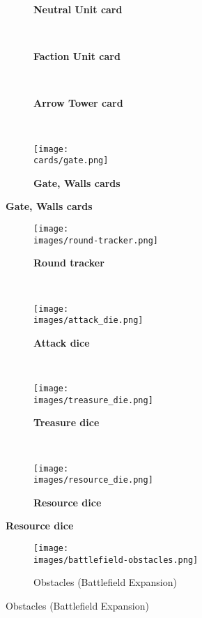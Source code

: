 \vspace*{-2em}
\begin{figure}[H]
  \centering
  \begin{subfigure}[t]{0.23\linewidth}
    \centering
    \caption{\textbf{Neutral Unit card}}
  \end{subfigure}
  ~
  \begin{subfigure}[t]{0.23\linewidth}
    \centering
    \caption{\textbf{Faction Unit card}}
  \end{subfigure}
  ~
  \begin{subfigure}[t]{0.25\linewidth}
    \centering
    \caption{\textbf{Arrow Tower card}}
  \end{subfigure}
  ~
  \begin{subfigure}[t]{0.13\linewidth}
    \centering
    \texttt{[image: \\cards/gate.png]}
    \caption{\textbf{Gate, Walls cards}}
  \end{subfigure}
\end{figure}
\vspace*{-2em}
\begin{figure}[H]
  \centering
  \begin{subfigure}[b]{0.3\linewidth}
    \centering
    \texttt{[image: \\images/round-tracker.png]}
    \caption{\textbf{Round tracker}}
  \end{subfigure}
  ~
  \begin{subfigure}[b]{0.1\linewidth}
    \centering
    \texttt{[image: \\images/attack\_die.png]}
    \caption{\textbf{Attack dice}}
  \end{subfigure}
  ~
  \begin{subfigure}[b]{0.1\linewidth}
    \centering
    \texttt{[image: \\images/treasure\_die.png]}
    \caption{\textbf{Treasure dice}}
  \end{subfigure}
  ~
  \begin{subfigure}[b]{0.12\linewidth}
    \centering
    \texttt{[image: \\images/resource\_die.png]}
    \caption{\textbf{Resource dice}}
  \end{subfigure}
\end{figure}
\vspace*{-1.5em}
\begin{figure}[H]
  \centering
  \begin{subfigure}[b]{0.5\linewidth}
    \centering
    \texttt{[image: \\images/battlefield-obstacles.png]}
    \caption{\centering Obstacles (Battlefield Expansion)}
  \end{subfigure}
\end{figure}


